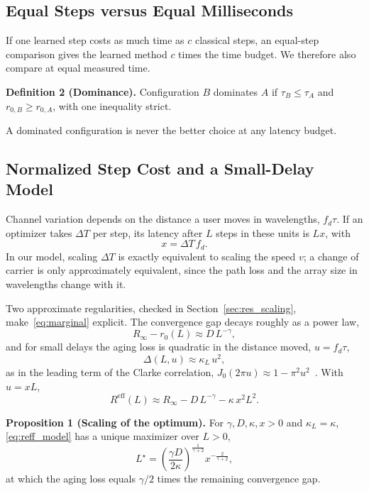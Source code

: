 \subsection{Equal Steps versus Equal Milliseconds}
If one learned step costs as much time as $c$ classical steps, an equal-step comparison gives the learned method $c$ times the time budget. We therefore also compare at equal measured time.

\textbf{Definition 2 (Dominance).} Configuration $B$ dominates $A$ if $\tau_B\le\tau_A$ and $r_{0,B}\ge r_{0,A}$, with one inequality strict.

A dominated configuration is never the better choice at any latency budget.

\subsection{Normalized Step Cost and a Small-Delay Model}
Channel variation depends on the distance a user moves in wavelengths, $f_d\tau$. If an optimizer takes $\Delta T$ per step, its latency after $L$ steps in these units is $Lx$, with
\begin{equation}
    x = \Delta T\, f_d .
    \label{eq:x}
\end{equation}
In our model, scaling $\Delta T$ is exactly equivalent to scaling the speed $v$; a change of carrier is only approximately equivalent, since the path loss and the array size in wavelengths change with it.

Two approximate regularities, checked in Section~\ref{sec:res_scaling}, make~\eqref{eq:marginal} explicit. The convergence gap decays roughly as a power law,
\begin{equation}
    R_\infty - r_0(L) \approx D\,L^{-\gamma},
    \label{eq:conv_law}
\end{equation}
and for small delays the aging loss is quadratic in the distance moved, $u=f_d\tau$,
\begin{equation}
    \Delta(L,u) \approx \kappa_L\, u^2 ,
    \label{eq:aging_law}
\end{equation}
as in the leading term of the Clarke correlation, $J_0(2\pi u)\approx 1-\pi^2u^2$~\cite{Clarke1968BSTJ,rappaport_wireless}. With $u = xL$,
\begin{equation}
    R^{\mathrm{eff}}(L) \approx R_\infty - D\,L^{-\gamma} - \kappa\, x^2 L^2 .
    \label{eq:reff_model}
\end{equation}

\textbf{Proposition 1 (Scaling of the optimum).} For $\gamma, D, \kappa, x > 0$ and $\kappa_L=\kappa$, \eqref{eq:reff_model} has a unique maximizer over $L>0$,
\begin{equation}
    L^\star = \left(\frac{\gamma D}{2\kappa}\right)^{\frac{1}{\gamma+2}} x^{-\frac{2}{\gamma+2}} ,
    \label{eq:Lstar}
\end{equation}
at which the aging loss equals $\gamma/2$ times the remaining convergence gap.

